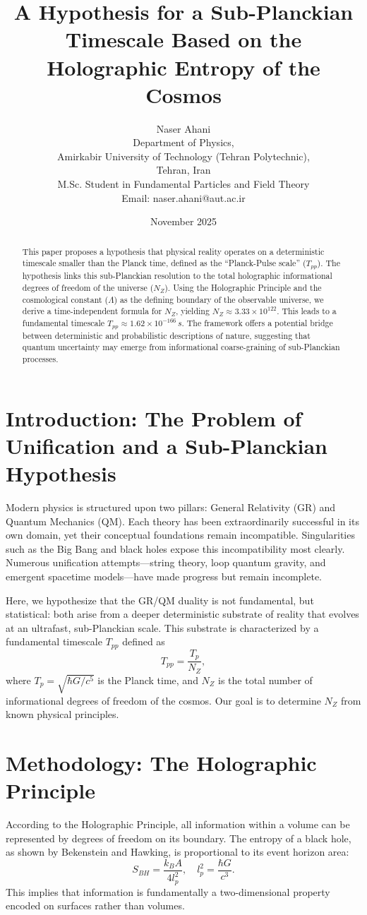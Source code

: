 \documentclass[12pt]{article}
\title{A Hypothesis for a Sub-Planckian Timescale Based on the Holographic Entropy of the Cosmos}
\author{Naser Ahani \\ Department of Physics, \\ Amirkabir University of Technology (Tehran Polytechnic), \\ Tehran, Iran \\ M.Sc. Student in Fundamental Particles and Field Theory \\ Email: naser.ahani@aut.ac.ir}
\date{November 2025}
\begin{document}
\maketitle

\begin{abstract}
This paper proposes a hypothesis that physical reality operates on a deterministic timescale smaller than the Planck time, defined as the ``Planck-Pulse scale'' ($T_{pp}$). The hypothesis links this sub-Planckian resolution to the total holographic informational degrees of freedom of the universe ($N_Z$). Using the Holographic Principle and the cosmological constant ($\Lambda$) as the defining boundary of the observable universe, we derive a time-independent formula for $N_Z$, yielding $N_Z \approx 3.33 \times 10^{122}$. This leads to a fundamental timescale $T_{pp} \approx 1.62 \times 10^{-166}\,s$. The framework offers a potential bridge between deterministic and probabilistic descriptions of nature, suggesting that quantum uncertainty may emerge from informational coarse-graining of sub-Planckian processes.
\end{abstract}

\section{Introduction: The Problem of Unification and a Sub-Planckian Hypothesis}
Modern physics is structured upon two pillars: General Relativity (GR) and Quantum Mechanics (QM). Each theory has been extraordinarily successful in its own domain, yet their conceptual foundations remain incompatible. Singularities such as the Big Bang and black holes expose this incompatibility most clearly. Numerous unification attempts---string theory, loop quantum gravity, and emergent spacetime models---have made progress but remain incomplete.

Here, we hypothesize that the GR/QM duality is not fundamental, but statistical: both arise from a deeper deterministic substrate of reality that evolves at an ultrafast, sub-Planckian scale. This substrate is characterized by a fundamental timescale $T_{pp}$ defined as
\begin{equation}
T_{pp} = \frac{T_p}{N_Z},
\end{equation}
where $T_p = \sqrt{\hbar G / c^5}$ is the Planck time, and $N_Z$ is the total number of informational degrees of freedom of the cosmos. Our goal is to determine $N_Z$ from known physical principles.

\section{Methodology: The Holographic Principle}
According to the Holographic Principle, all information within a volume can be represented by degrees of freedom on its boundary. The entropy of a black hole, as shown by Bekenstein and Hawking, is proportional to its event horizon area:
\begin{equation}
S_{BH} = \frac{k_B A}{4 l_p^2}, \quad l_p^2 = \frac{\hbar G}{c^3}.
\end{equation}
This implies that information is fundamentally a two-dimensional property encoded on surfaces rather than volumes.
\end{document}
